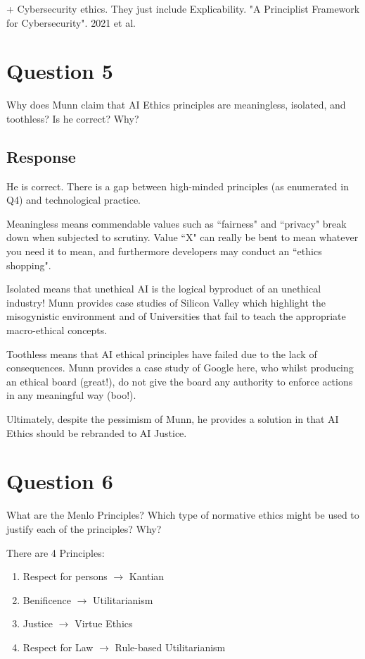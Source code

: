 \documentclass{scrartcl}
\begin{document}
+ Cybersecurity ethics. They just include Explicability. "A Principlist Framework for Cybersecurity". 2021 et al.

\newpage
\section{Question 5}
\begin{tcolorbox}[colback=white,colframe=purple, sharp corners]
    Why does Munn claim that AI Ethics principles are meaningless, isolated, and toothless? Is he correct? Why?
\end{tcolorbox}

\subsection{Response}
He is correct. There is a gap between high-minded principles (as enumerated in Q4) and technological practice. 

Meaningless means commendable values such as ``fairness" and ``privacy" break down when subjected to scrutiny. Value ``X" can really be bent to mean whatever you need it to mean, and furthermore developers may conduct an ``ethics shopping".

Isolated means that unethical AI is the logical byproduct of an unethical industry! Munn provides case studies of Silicon Valley which highlight the misogynistic environment and of Universities that fail to teach the appropriate macro-ethical concepts.

Toothless means that AI ethical principles have failed due to the lack of consequences. Munn provides a case study of Google here, who whilst producing an ethical board (great!), do not give the board any authority to enforce actions in any meaningful way (boo!).

Ultimately, despite the pessimism of Munn, he provides a solution in that AI Ethics should be rebranded to AI Justice.


\newpage
\section{Question 6}
\begin{tcolorbox}[colback=white,colframe=purple, sharp corners]
    What are the Menlo Principles? Which type of normative ethics might be used to justify each of the principles? Why?
\end{tcolorbox}

There are 4 Principles:
\begin{enumerate}
    \item Respect for persons \(\rightarrow\) Kantian
    \item Benificence \(\rightarrow\) Utilitarianism
    \item Justice \(\rightarrow\) Virtue Ethics
    \item Respect for Law \(\rightarrow\) Rule-based Utilitarianism
\end{enumerate}
\end{document}
